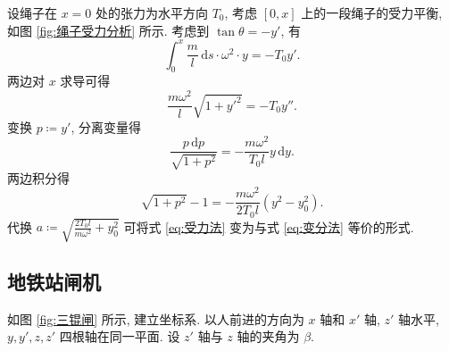 \documentclass{article}
\begin{document}
设绳子在 $x=0$ 处的张力为水平方向 $T_0$,
考虑 $\left[0,x\right]$ 上的一段绳子的受力平衡, 如图 \ref{fig:绳子受力分析} 所示.
考虑到 $\tan\theta=-y'$, 有
\begin{equation}
	\int_0^x\frac ml\,\mathrm ds\cdot\omega^2\cdot y=-T_0y'.
\end{equation}
两边对 $x$ 求导可得
\begin{equation}
	\frac{m\omega^2}{l}\sqrt{1+y'^2}=-T_0y''.
\end{equation}
变换 $p\coloneqq y'$, 分离变量得
\begin{equation}
	\frac{p\,\mathrm dp}{\sqrt{1+p^2}}=-\frac{m\omega^2}{T_0l}y\,\mathrm dy.
\end{equation}
两边积分得
\begin{equation}
	\sqrt{1+p^2}-1=-\frac{m\omega^2}{2T_0l}\left(y^2-y_0^2\right).
	\label{eq:受力法}
\end{equation}
代换 $a\coloneqq \sqrt{\frac{2T_0l}{m\omega^2}+y_0^2}$ 可将式 \ref{eq:受力法} 变为与式 \ref{eq:变分法} 等价的形式.

\subsection{地铁站闸机}

如图 \ref{fig:三锟闸} 所示, 建立坐标系.
以人前进的方向为 $x$ 轴和 $x'$ 轴, $z'$ 轴水平, $y,y',z,z'$ 四根轴在同一平面.
设 $z'$ 轴与 $z$ 轴的夹角为 $\beta$.
\end{document}
